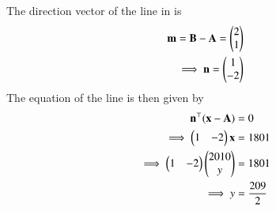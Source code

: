 The direction vector of the line in  is
\begin{align}
\mathbf{m} = \mathbf{B} - \mathbf{A}
= \begin{pmatrix}2 \\ 1\end{pmatrix}
\\
\implies \mathbf{n}
= \begin{pmatrix}1 \\ -2\end{pmatrix}
\end{align}
 The equation of the line is then given by 
\begin{align}
\mathbf{n}^{\top} (\mathbf{x} -\mathbf{A}) &= 0 \\
\implies 
\begin{pmatrix}1& -2\end{pmatrix} \mathbf{x} &= 1801
\\
\implies  \begin{pmatrix}1&-2\end{pmatrix} \begin{pmatrix}2010\\y\end{pmatrix} &= 1801 \\
\implies y &= \frac{209}{2}
\end{align}




